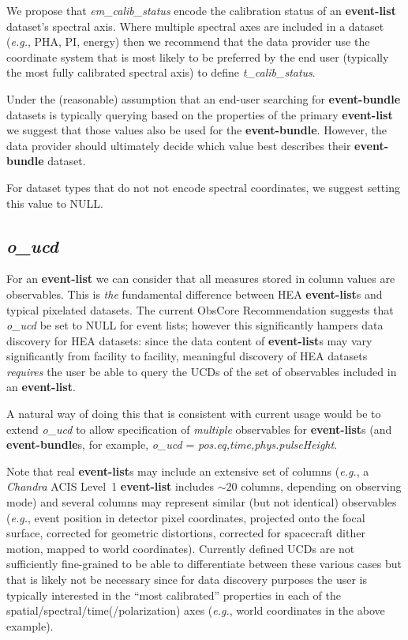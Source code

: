 \documentclass[11pt,a4paper]{ivoa}
\begin{document}
We propose that {\em em\_calib\_status}  encode the calibration status of an {\bf event-list} dataset's spectral axis.  Where multiple spectral axes are included in a dataset ({\em e.g.\/}, PHA, PI, energy) then we recommend that the data provider use the coordinate system that is most likely to be preferred by the end user (typically the most fully calibrated spectral axis) to define {\em t\_calib\_status\/}.

Under the (reasonable) assumption that an end-user searching for {\bf event-bundle} datasets is typically querying based on the properties of the primary {\bf event-list} we suggest that those values also be used for the {\bf event-bundle}.  However, the data provider should ultimately decide which value best describes their {\bf event-bundle} dataset.

For dataset types that do not not encode spectral coordinates, we suggest setting this value to NULL\null.

\subsection{{\em o\_ucd}}

For an {\bf event-list} we can consider that all measures stored in column values are observables.  This is {\em the\/} fundamental difference between HEA {\bf event-list}s and typical pixelated datasets.  The current ObsCore Recommendation suggests that {\em o\_ucd\/} be set to NULL for event lists; however this significantly hampers data discovery for HEA datasets: since the data content of {\bf event-list}s may vary significantly from facility to facility, meaningful discovery of HEA datasets {\em requires\/} the user be able to query the UCDs of the set of observables included in an {\bf event-list}.

A natural way of doing this that is consistent with current usage would be to extend {\em o\_ucd\/} to allow specification of {\em multiple\/} observables for {\bf event-list}s (and {\bf event-bundle}s, for example, {\em o\_ucd\/} = {\em pos.eq,time,phys.pulseHeight\/}.

Note that real {\bf event-list}s may include an extensive set of columns ({\em e.g.\/}, a {\em Chandra\/} ACIS Level~1 {\bf event-list} includes $\sim\!20$ columns, depending on observing mode) and several columns may represent similar (but not identical) observables ({\em e.g.\/}, event position in detector pixel coordinates, projected onto the focal surface, corrected for geometric distortions, corrected for spacecraft dither motion, mapped to world coordinates).  Currently defined UCDs are not sufficiently fine-grained to be able to differentiate between these various cases but that is likely not be necessary since for data discovery purposes the user is typically interested in the ``most calibrated'' properties in each of the spatial/spectral/time(/polarization) axes ({\em e.g.\/}, world coordinates in the above example).
\end{document}
